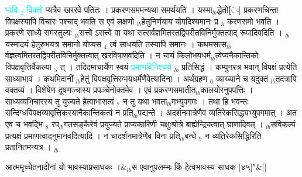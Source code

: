 \documentclass[article,12pt,a4paper]{memoir}%
\newcommand{\quotelemma}[1]{\textcolor{cyan}{#1}}
\begin{document}
	  
	  \pstart \leavevmode%
	\hphantom{.}\quotelemma{भावि {\tiny $_{2}$} विक्तो} प्यत्रैव खररवे पतितः । प्रकरणसममन्यथा समर्थयति । यस्मा{\tiny $_{lb}$}द्धेतो[ः] प्रकरणचिन्ता विपक्षस्यापि विचारः पश्चाद् भवति स एवं लक्षणो {\tiny $_{lb}$}हेतुनिर्णयाय योपदिश्यमानः प्र {\tiny $_{3}$} करणसमो भवति । प्रकरणे साध्ये समस्तुल्यः {\tiny $_{lb}$}सत्त्वे ऽसत्त्वे वा यथा सत्सर्वज्ञमितरतद्विपरीतविनिर्मुक्तत्वाद् रूपादिवदिति । {\tiny $_{lb}$}यस्मादयं हेतुरुभयत्र समानो योप्यस {\tiny $_{4}$} त्वं साधयति तस्यापि समानः । कथमसत्स{\tiny $_{lb}$}र्वज्ञत्वमितरतद्विपरीतविनिर्मुक्तत्वात् खरविषाणवदिति । न चायं किलोभयधर्म{\tiny $_{lb}$}त्वेप्यनैकान्तिको विपक्षवृत्तिर्वैकल्या {\tiny $_{5}$} त् । तदिदमाचार्येण स्वयं \quotelemma{प्रमाणविनिश्चये}  {\tiny $_{lb}$} प्रतिसिद्धं । कम्पुनरत्र भवान् विपक्षं प्रत्येति साध्याभावं । कथमिदानीं {\tiny $_{lb}$}हेतुं विपक्षवृत्तिरुभयधर्मेणैवेत्यादिना । अर्थग्रहण {\tiny $_{6}$} व्याख्याने च यदुक्तं {\tiny $_{lb}$}तदत्रापि वक्तव्यं । विशेषेण दूषणञ्चास्य प्रपञ्चेनोक्तमेव । एवं प्रकरणसमातीत{\tiny $_{lb}$}कालयोरनुपपत्तिः । साध्यव्यभिचारस्य तु युज्यते हेत्वाभासत्वं {\tiny $_{7}$} न तु यथा भवता{\tiny $_{lb}$}मभ्युपगमः । तथा हि भवन्तः सन्दिग्धविपक्षव्यावृत्तिकस्यानैकान्तिकत्वं न प्रति{\tiny $_{lb}$}पद्यन्ते । अदर्शनमात्रेणैव व्यतिरेकसिद्ध्यभ्युपगमात् । अत एव च भवद्भि {\tiny $_{8}$} रप{\tiny $_{lb}$}गतसङ्कैरेवं प्रयुज्यते प्राप्यकारिणी चक्षुःश्रोत्रे बाह्येन्द्रियत्वात् घ्राणादिवत् । {\tiny $_{lb}$}सविकल्पं प्रत्यक्षं प्रमाणत्वादनुमानवदित्यादि । न चादर्शनमात्रेणैव विना प्रति{\tiny $_{lb}$}बन्धे {\tiny $_{9}$} \leavevmode{} न व्यतिरेकसिद्धिरिति प्रतानितमन्यत्र । {\tiny $_{lb}$} 
	    \pend%
	  
	    
	    \stanza[\smallbreak]
	  आत्ममृच्चेतनादीनां यो भावस्याप्रसाधकः ।&{\tiny $_{lb}$}स एवानुपलम्भः किं हेत्वभावस्य साधक [४५]{\normalfontlatin\large\qquad{}"}\&[\smallbreak]
	  
\end{document}
